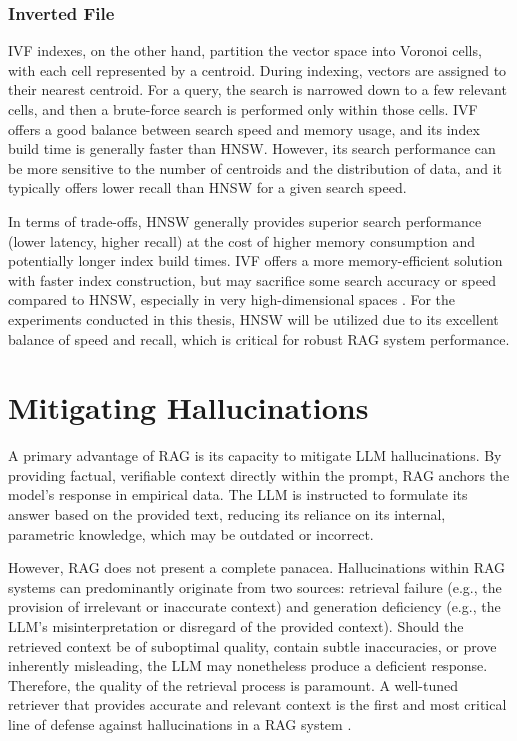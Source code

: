 \subsubsection{Inverted File}
IVF indexes, on the other hand, partition the vector space into Voronoi cells, with each cell represented by a centroid. During indexing, vectors are assigned to their nearest centroid. For a query, the search is narrowed down to a few relevant cells, and then a brute-force search is performed only within those cells. IVF offers a good balance between search speed and memory usage, and its index build time is generally faster than HNSW. However, its search performance can be more sensitive to the number of centroids and the distribution of data, and it typically offers lower recall than HNSW for a given search speed.

In terms of trade-offs, HNSW generally provides superior search performance (lower latency, higher recall) at the cost of higher memory consumption and potentially longer index build times. IVF offers a more memory-efficient solution with faster index construction, but may sacrifice some search accuracy or speed compared to HNSW, especially in very high-dimensional spaces \autocite{aumüller2018annbenchmarksbenchmarkingtoolapproximate}. For the experiments conducted in this thesis, HNSW will be utilized due to its excellent balance of speed and recall, which is critical for robust RAG system performance.

\section{Mitigating Hallucinations}
A primary advantage of RAG is its capacity to mitigate LLM hallucinations. By providing factual, verifiable context directly within the prompt, RAG anchors the model's response in empirical data. The LLM is instructed to formulate its answer based on the provided text, reducing its reliance on its internal, parametric knowledge, which may be outdated or incorrect.

However, RAG does not present a complete panacea. Hallucinations within RAG systems can predominantly originate from two sources: retrieval failure (e.g., the provision of irrelevant or inaccurate context) and generation deficiency (e.g., the LLM's misinterpretation or disregard of the provided context). Should the retrieved context be of suboptimal quality, contain subtle inaccuracies, or prove inherently misleading, the LLM may nonetheless produce a deficient response. Therefore, the quality of the retrieval process is paramount. A well-tuned retriever that provides accurate and relevant context is the first and most critical line of defense against hallucinations in a RAG system \autocite{gao2024retrievalaugmentedgenerationlargelanguage}.
